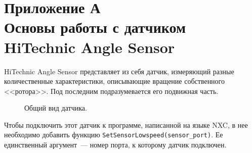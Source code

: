 \newpage
\section{Приложение А\\
Основы работы с датчиком HiTechnic Angle Sensor}
\hspace*{\parindent}HiTechnic Angle Sensor представляет из себя датчик, измеряющий разные количественные характеристики, описывающие вращение собственного <<ротора>>.
Под последним подразумевается его подвижная часть.

\begin{figure}[h]
	\noindent{}
	\caption{Общий вид датчика.}
	\label{sensor}
\end{figure}

Чтобы подключить этот датчик к программе, написанной на языке NXC, в нее необходимо добавить функцию \verb|SetSensorLowspeed(sensor_port)|.
Ее единственный аргумент~--- номер порта, к которому датчик подключен.

